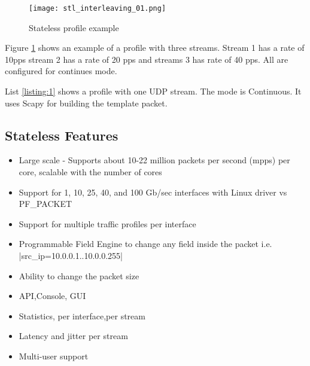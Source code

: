 \documentclass[conference]{IEEEtran}
\begin{document}
\begin{figure}[h]
  \texttt{[image: stl\_interleaving\_01.png]}
  \caption{Stateless profile example}
  \label{fig:stlhello}
\end{figure}

Figure \ref{fig:stlhello} shows an example of a profile with three streams.  
Stream 1 has a rate of 10pps stream 2 has a rate of 20 pps and streams 3 has rate of 40 pps. All are configured for continues mode.

List \ref{listing:1} shows a profile with one UDP stream. The mode is Continuous. 
It uses Scapy for building the template packet. 

  
\subsection{Stateless Features}

\begin{itemize}
  \item Large scale - Supports about 10-22 million packets per second (mpps) per core, scalable with the number of cores
  \item Support for 1, 10, 25, 40, and 100 Gb/sec interfaces with Linux driver vs PF\_PACKET
  \item Support for multiple traffic profiles per interface
  \item Programmable Field Engine to change any field inside the packet i.e. |src_ip=10.0.0.1..10.0.0.255|
  \item Ability to change the packet size 
  \item API,Console, GUI
  \item Statistics, per interface,per stream 
  \item Latency and jitter per stream
  \item Multi-user support 
\end{itemize}
\end{document}
